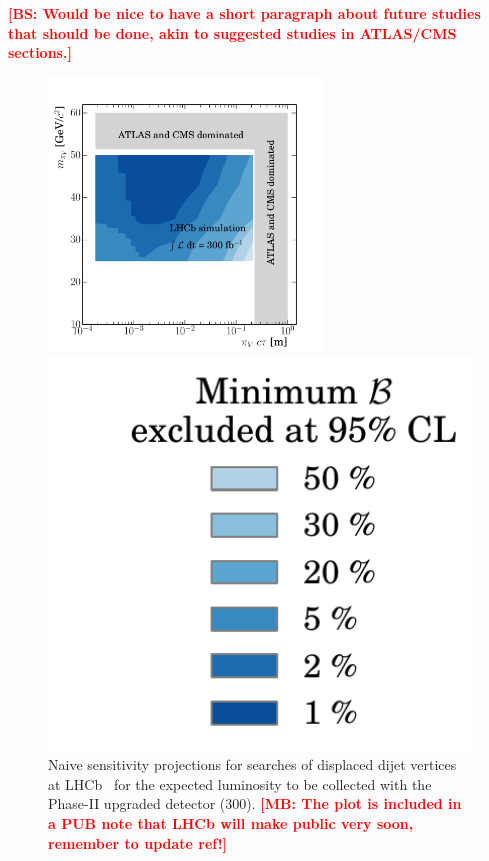 {\bf \textcolor{red}{[BS: Would be nice to have a short paragraph about future studies that should be done, akin to suggested studies in ATLAS/CMS sections.]}}

\begin{figure}[t]
  \includegraphics[width=0.65\textwidth]{figures/LLP_compare_PIV_4_HL.pdf}
  \begin{minipage}[t]{0.26\textwidth}
  \vspace{-6.cm}
  \hspace{-0.7cm}
  \includegraphics[width=1.2\textwidth]{figures/LLP_compare_legend.pdf}
  \end{minipage}
  \caption{Naive sensitivity projections for searches of displaced dijet vertices at LHCb~\cite{Aaij:2017mic} for the expected luminosity to be collected with the Phase-II upgraded detector (300\invfb). {\bf \textcolor{red}{[MB: The plot is included in a PUB note that LHCb will make public very soon, remember to update ref!]}}}
  \label{fig:dvsearches_hllhc}
\end{figure}

